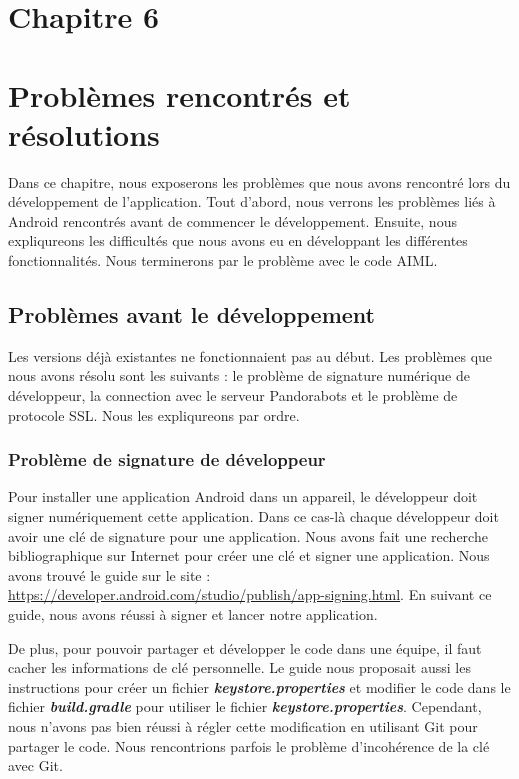 \section*{Chapitre 6}
\section{Problèmes rencontrés et résolutions}

\indent Dans ce chapitre, nous exposerons les problèmes que nous avons rencontré lors du développement de l'application. Tout d'abord, nous verrons les problèmes liés à Android rencontrés avant de commencer le développement. Ensuite, nous expliqureons les difficultés que nous avons eu en développant les différentes fonctionnalités. Nous terminerons par le problème avec le code AIML.

\subsection{Problèmes avant le développement}

\indent Les versions déjà existantes ne fonctionnaient pas au début. Les problèmes que nous avons résolu sont les suivants : le problème de signature numérique de développeur, la connection avec le serveur Pandorabots et le problème de protocole SSL. Nous les expliqureons par ordre.

\subsubsection{Problème de signature de développeur}

\indent Pour installer une application Android dans un appareil, le développeur doit signer numériquement cette application. Dans ce cas-là chaque développeur doit avoir une clé de signature pour une application. Nous avons fait une recherche bibliographique sur Internet pour créer une clé et signer une application. Nous avons trouvé le guide sur le site : 
\url{https://developer.android.com/studio/publish/app-signing.html}. En suivant ce guide, nous avons réussi à signer et lancer notre application.

\indent De plus, pour pouvoir partager et développer le code dans une équipe, il faut cacher les informations de clé personnelle. Le guide nous proposait aussi les instructions pour créer un fichier \textbf{\emph{keystore.properties}} et modifier le code dans le fichier \textbf{\emph{build.gradle}} pour utiliser le fichier \textbf{\emph{keystore.properties}}. Cependant, nous n'avons pas bien réussi à régler cette modification en utilisant Git pour partager le code. Nous rencontrions parfois le problème d'incohérence de la clé avec Git.

